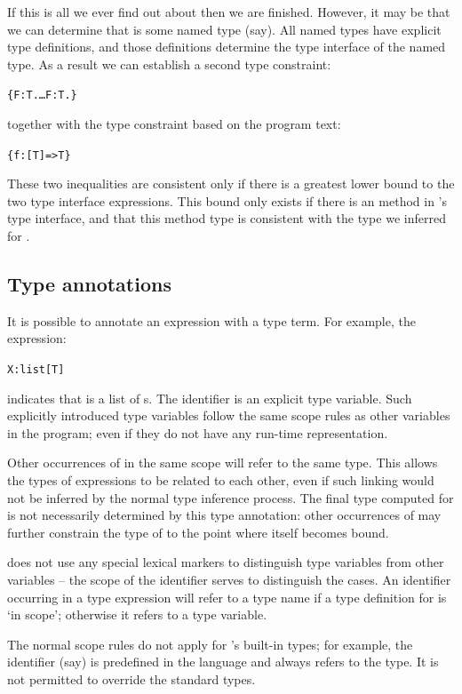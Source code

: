 If this is all we ever find out about  then we are finished. However, it may be that we can determine that  is some named type  (say). All named types have explicit type definitions, and those definitions determine the type interface of the named type. As a result we can establish a second type constraint:
\begin{alltt}
 \typearrow \{ F:T. \ldots F:T.\}
\end{alltt}
together with the type constraint based on the program text:
\begin{alltt}
 \typearrow \{ f:[T]=>T \}
\end{alltt}
These two inequalities are consistent only if there is a greatest lower bound to the two type interface expressions. This bound only exists if there is an  method in 's type interface, and that this method type is consistent with the type we inferred for .

\subsection{Type annotations}
\label{type:annotation}
It is possible to annotate an expression with a type term. For example, the expression:
\begin{alltt}
X:list[T]
\end{alltt}
indicates that  is a list of s. The identifier  is an explicit type variable. Such explicitly introduced type variables follow the same scope rules as other variables in the program; even if they do not have any run-time representation.

Other occurrences of  in the same scope will refer to the same type. This allows the types of expressions to be related to each other, even if such linking would not be inferred by the normal type inference process. The final type computed for  is not necessarily determined by this type annotation: other occurrences of  may further constrain the type of  to the point where  itself becomes bound.

\go does not use any special lexical markers to distinguish type variables from other variables -- the scope of the identifier serves to distinguish the cases. An identifier  occurring in a type expression will refer to a type name if a type definition for  is `in scope'; otherwise it refers to a type variable.

The normal scope rules do not apply for \go's built-in types; for example, the identifier  (say) is predefined in the language and always refers to the  type. It is not permitted to override the standard types.

